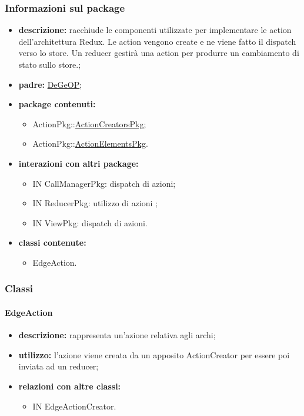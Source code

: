 \subsubsection{Informazioni sul package}
\begin{itemize}
	\item \textbf{descrizione:} racchiude le componenti utilizzate per implementare le action dell'architettura Redux. Le action vengono create e ne viene fatto il dispatch verso lo store. Un reducer gestirà una action per produrre un cambiamento di stato sullo store.;
	\item \textbf{padre:} \hyperref[pkg::DeGeOP]{DeGeOP};
	\item \textbf{package contenuti:}
	\begin{itemize}
		\item ActionPkg::\hyperref[pkg::ActionCreatorsPkg]{ActionCreatorsPkg};
		\item ActionPkg::\hyperref[pkg::ActionElementsPkg]{ActionElementsPkg}.
	\end{itemize}
	\item \textbf{interazioni con altri package:} 
	\begin{itemize}
		\item IN CallManagerPkg: dispatch di azioni;
		\item IN ReducerPkg: utilizzo di azioni ;
		\item IN ViewPkg: dispatch di azioni.
	\end{itemize}
	\item \textbf{classi contenute:}
	\begin{itemize}
		\item EdgeAction.
	\end{itemize}
\end{itemize}
\subsubsection{Classi}
\paragraph{EdgeAction}
\begin{itemize}
	\item \textbf{descrizione:} rappresenta un'azione relativa agli archi;
	\item \textbf{utilizzo:} l'azione viene creata da un apposito ActionCreator per essere poi inviata ad un reducer;
	\item \textbf{relazioni con altre classi:} 
	\begin{itemize}
		\item IN EdgeActionCreator.
	\end{itemize}
\end{itemize}
\newpage
